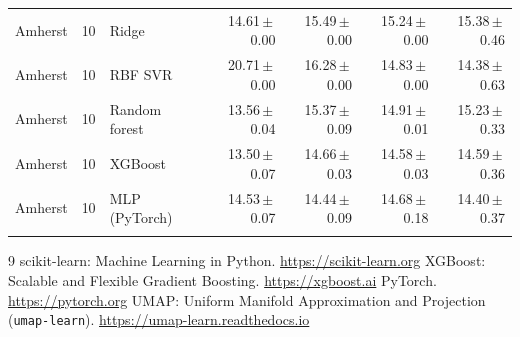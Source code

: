 \documentclass[11pt,letterpaper]{article}
\begin{document}
{\begin{longtable}{@{}llp{2.35cm}rrrr@{}}
\addlinespace[2pt]
Amherst & 10 & Ridge & 14.61\,$\pm$\,0.00 & 15.49\,$\pm$\,0.00 & 15.24\,$\pm$\,0.00 & 15.38\,$\pm$\,0.46 \\
Amherst & 10 & RBF SVR & 20.71\,$\pm$\,0.00 & 16.28\,$\pm$\,0.00 & 14.83\,$\pm$\,0.00 & 14.38\,$\pm$\,0.63 \\
Amherst & 10 & Random forest & 13.56\,$\pm$\,0.04 & 15.37\,$\pm$\,0.09 & 14.91\,$\pm$\,0.01 & 15.23\,$\pm$\,0.33 \\
Amherst & 10 & XGBoost & 13.50\,$\pm$\,0.07 & 14.66\,$\pm$\,0.03 & 14.58\,$\pm$\,0.03 & 14.59\,$\pm$\,0.36 \\
Amherst & 10 & MLP (PyTorch) & 14.53\,$\pm$\,0.07 & 14.44\,$\pm$\,0.09 & 14.68\,$\pm$\,0.18 & 14.40\,$\pm$\,0.37 \\
\addlinespace[2pt]
\bottomrule\end{longtable}
}
\clearpage

\begin{thebibliography}{9}
 scikit-learn: Machine Learning in Python. \url{https://scikit-learn.org}
 XGBoost: Scalable and Flexible Gradient Boosting. \url{https://xgboost.ai}
 PyTorch. \url{https://pytorch.org}
 UMAP: Uniform Manifold Approximation and Projection (\texttt{umap-learn}). \url{https://umap-learn.readthedocs.io}
\end{thebibliography}
\end{document}
